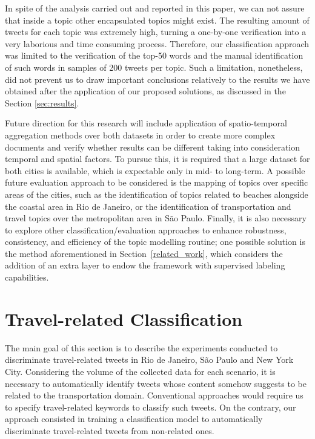 In spite of the analysis carried out and reported in this paper, we can not assure that inside a topic other encapsulated topics might exist. The resulting amount of tweets for each topic was extremely high, turning a one-by-one verification into a very laborious and time consuming process. Therefore, our classification approach was limited to the verification of the top-50 words and the manual identification of such words in samples of 200 tweets per topic. Such a limitation, nonetheless, did not prevent us to draw important conclusions relatively to the results we have obtained after the application of our proposed solutions, as discussed in the Section \ref{sec:results}.

Future direction for this research will include application of spatio-temporal aggregation methods over both datasets in order to create more complex documents and verify whether results can be different taking into consideration temporal and spatial factors. To pursue this, it is required that a large dataset for both cities is available, which is expectable only in mid- to long-term. A possible future evaluation approach to be considered is the mapping of topics over specific areas of the cities, such as the identification of topics related to beaches alongside the coastal area in Rio de Janeiro, or the identification of transportation and travel topics over the metropolitan area in São Paulo. Finally, it is also necessary to explore other classification/evaluation approaches to enhance robustness, consistency, and efficiency of the topic modelling routine; one possible solution is the method aforementioned in Section~\ref{related_work}, which considers the addition of an extra layer to endow the framework with supervised labeling capabilities.

\section{Travel-related Classification}
\label{sec:travel_related_classification}
The main goal of this section is to describe the experiments conducted to discriminate travel-related tweets in Rio de Janeiro, São Paulo and New York City. Considering the volume of the collected data for each scenario, it is necessary to automatically identify tweets whose content somehow suggests to be related to the transportation domain. Conventional approaches would require us to specify travel-related keywords to classify such tweets. On the contrary, our approach consisted in training a classification model to automatically discriminate travel-related tweets from non-related ones. 

